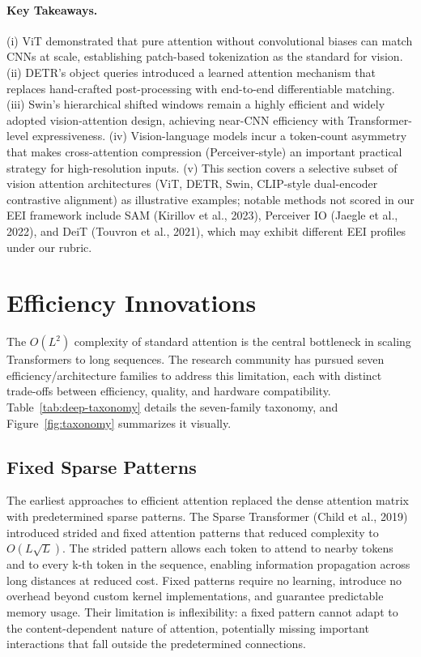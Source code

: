 \documentclass[10pt,twocolumn]{article}
\begin{document}
\paragraph{Key Takeaways.} (i) ViT demonstrated that pure attention without convolutional biases can match CNNs at scale, establishing patch-based tokenization as the standard for vision. (ii) DETR's object queries introduced a learned attention mechanism that replaces hand-crafted post-processing with end-to-end differentiable matching. (iii) Swin's hierarchical shifted windows remain a highly efficient and widely adopted vision-attention design, achieving near-CNN efficiency with Transformer-level expressiveness. (iv) Vision-language models incur a token-count asymmetry that makes cross-attention compression (Perceiver-style) an important practical strategy for high-resolution inputs. (v) This section covers a selective subset of vision attention architectures (ViT, DETR, Swin, CLIP-style dual-encoder contrastive alignment) as illustrative examples; notable methods not scored in our EEI framework include SAM (Kirillov et al., 2023), Perceiver IO (Jaegle et al., 2022), and DeiT (Touvron et al., 2021), which may exhibit different EEI profiles under our rubric.

\section{Efficiency Innovations}\label{efficiency-innovations}

The $O(L^2)$ complexity of standard attention is the central bottleneck in scaling Transformers to long sequences. The research community has pursued seven efficiency/architecture families to address this limitation, each with distinct trade-offs between efficiency, quality, and hardware compatibility. Table~\ref{tab:deep-taxonomy} details the seven-family taxonomy, and Figure~\ref{fig:taxonomy} summarizes it visually.

\subsection{Fixed Sparse Patterns}\label{fixed-sparse-patterns}

The earliest approaches to efficient attention replaced the dense attention matrix with predetermined sparse patterns. The Sparse Transformer (Child et al., 2019) introduced strided and fixed attention patterns that reduced complexity to $O(L\sqrt{L})$. The strided pattern allows each token to attend to nearby tokens and to every k-th token in the sequence, enabling information propagation across long distances at reduced cost. Fixed patterns require no learning, introduce no overhead beyond custom kernel implementations, and guarantee predictable memory usage. Their limitation is inflexibility: a fixed pattern cannot adapt to the content-dependent nature of attention, potentially missing important interactions that fall outside the predetermined connections.
\end{document}
